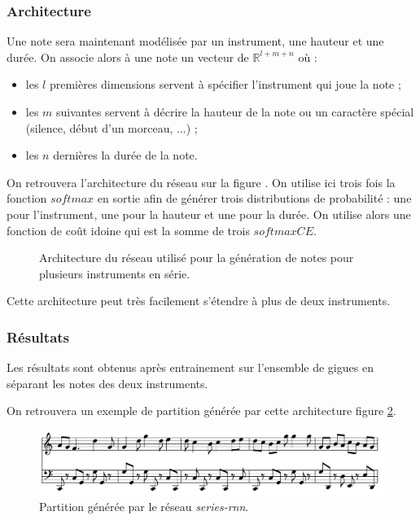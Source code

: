 \subsubsection{Architecture}

Une note sera maintenant modélisée par un instrument, une hauteur et une durée. On associe alors à une note un vecteur de $\mathbb{R}^{l+m+n}$ où :
\begin{itemize}
\item les $l$ premières dimensions servent à spécifier l'instrument qui joue la note ;
\item les $m$ suivantes servent à décrire la hauteur de la note ou un caractère spécial (silence, début d'un morceau, ...) ;
\item les $n$ dernières la durée de la note.
\end{itemize}

On retrouvera l'architecture du réseau sur la figure \label{series_rnn}. On utilise ici trois fois la fonction $softmax$ en sortie afin de générer trois distributions de probabilité : une pour l'instrument, une pour la hauteur et une pour la durée. On utilise alors une fonction de coût idoine qui est la somme de trois $softmaxCE$. 

\begin{figure}[h!]
\begin{center}

\caption{Architecture du réseau utilisé pour la génération de notes pour plusieurs instruments en série.}
\label{series_rnn}
\end{center}
\end{figure}

Cette architecture peut très facilement s'étendre à plus de deux instruments.

\subsubsection{Résultats}

Les résultats sont obtenus après entrainement sur l'ensemble de gigues en séparant les notes des deux instruments.

On retrouvera un exemple de partition générée par cette architecture figure \ref{serie_rnn}.

\begin{figure}[h!]
\begin{center}
\includegraphics[scale=0.3]{images/chapter9/series_rnn_result.png}
\caption{Partition générée par le réseau \textit{series-rnn}.}
\label{serie_rnn}
\end{center}
\end{figure}

